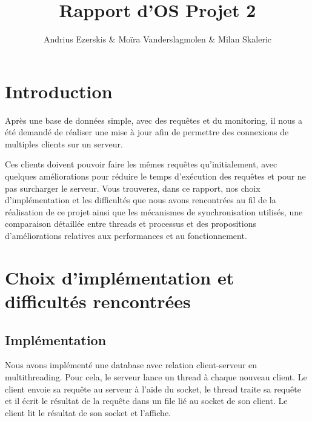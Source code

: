 \documentclass[utf8]{article}
\begin{document}
\begin{titlepage}


\author{Andrius Ezerskis \& Moïra Vanderslagmolen \& Milan Skaleric}
\title{Rapport d'OS Projet 2}

\maketitle
\end{titlepage}
\begin{large}

\section{Introduction}
\par
\indent

Après une base de données simple, avec des requêtes et du monitoring, il nous a
été demandé de réaliser une mise à jour afin de permettre des connexions de
multiples clients sur un serveur.

\par
\par

Ces clients doivent pouvoir faire les mêmes requêtes qu'initialement, avec
quelques améliorations pour réduire le temps d'exécution des requêtes et pour ne
pas surcharger le serveur. Vous trouverez, dans ce rapport, nos choix
d'implémentation et les difficultés que nous avons rencontrées au fil de la
réalisation de ce projet ainsi que les mécanismes de synchronisation utilisés,
une comparaison détaillée entre threads et processus et des propositions
d'améliorations relatives aux performances et au fonctionnement.

\par
\section{Choix d'implémentation et difficultés rencontrées}

\subsection{Implémentation}
\par
\indent

Nous avons implémenté une database avec relation client-serveur en
multithreading. Pour cela, le serveur lance un thread à chaque nouveau client.
Le client envoie sa requête au serveur à l'aide du socket, le thread traite sa
requête et il écrit le résultat de la requête dans un file lié au socket de son
client. Le client lit le résultat de son socket et l'affiche.
\par

\end{large}
\end{document}

